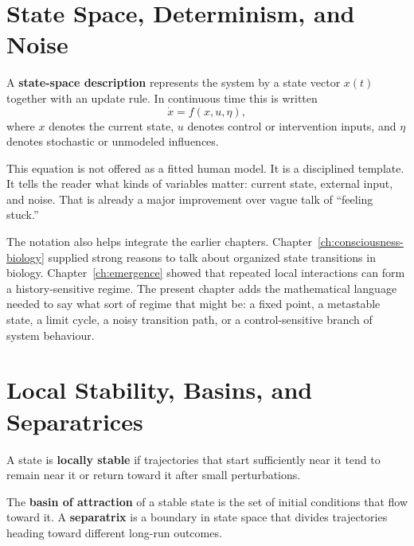 \section{State Space, Determinism, and Noise}

\begin{definition}
A \textbf{state-space description} represents the system by a state vector
$x(t)$ together with an update rule. In continuous time this is written
\[
  \dot{x} = f(x,u,\eta),
\]
where $x$ denotes the current state, $u$ denotes control or intervention
inputs, and $\eta$ denotes stochastic or unmodeled influences.
\end{definition}

\begin{remark}
This equation is not offered as a fitted human model. It is a disciplined
template. It tells the reader what kinds of variables matter: current state,
external input, and noise. That is already a major improvement over vague talk
of ``feeling stuck.''
\end{remark}

The notation also helps integrate the earlier chapters. Chapter~\ref{ch:consciousness-biology}
supplied strong reasons to talk about organized state transitions in biology.
Chapter~\ref{ch:emergence} showed that repeated local interactions can form a
history-sensitive regime. The present chapter adds the mathematical language
needed to say what sort of regime that might be: a fixed point, a metastable
state, a limit cycle, a noisy transition path, or a control-sensitive branch of
system behaviour.

\section{Local Stability, Basins, and Separatrices}

\begin{definition}
A state is \textbf{locally stable} if trajectories that start sufficiently
near it tend to remain near it or return toward it after small perturbations.
\end{definition}

\begin{definition}
The \textbf{basin of attraction} of a stable state is the set of initial
conditions that flow toward it. A \textbf{separatrix} is a boundary in state
space that divides trajectories heading toward different long-run outcomes.
\end{definition}

